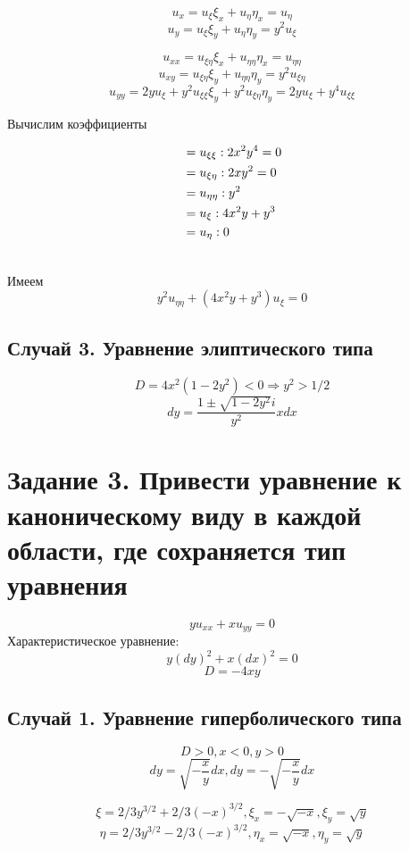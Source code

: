 \documentclass[12pt]{article}
\begin{document}
$$u_x = u_\xi\xi_x + u_\eta\eta_x = u_\eta$$
$$u_y = u_\xi\xi_y + u_\eta\eta_y = y^2u_\xi$$

$$u_{xx} = u_{\xi\eta}\xi_x + u_{\eta\eta}\eta_x = u_{\eta\eta}$$
$$u_{xy} = u_{\xi\eta}\xi_y + u_{\eta\eta}\eta_y = y^2u_{\xi\eta}$$
$$u_{yy} = 2yu_\xi + y^2u_{\xi\xi}\xi_y + y^2u_{\xi\eta}\eta_y = 2yu_\xi + y^4u_{\xi\xi}$$

Вычислим коэффициенты

\begin{align}
&=u_{\xi\xi} : 2x^2y^4 = 0 \\ \notag
&=u_{\xi\eta}: 2xy^2 = 0 \\ \notag
&=u_{\eta\eta}: y^2 \\ \notag
&=u_\xi: 4x^2y + y^3 \\ \notag
&=u_\eta: 0 \\ \notag
\end{align}

Имеем
$$y^2u_{\eta\eta} + (4x^2y + y^3)u_\xi = 0$$


\subsection{Случай 3. Уравнение элиптического типа}
$$D = 4x^2(1-2y^2) < 0 \Rightarrow y^2 > 1/2$$
$$dy = \frac{1 \pm \sqrt{1-2y^2}i}{y^2}xdx$$

\section{Задание 3. Привести уравнение к каноническому виду в каждой области, где сохраняется тип уравнения}
$$yu_{xx} + xu_{yy} = 0$$
Характеристическое уравнение:
$$y(dy)^2 + x(dx)^2 = 0$$
$$D = -4xy$$

\subsection{Случай 1. Уравнение гиперболического типа}
$$D > 0, x < 0, y > 0$$
$$dy = \sqrt{-\frac{x}{y}}dx,
dy = -\sqrt{-\frac{x}{y}}dx$$

$$\xi = 2/3y^{3/2} + 2/3(-x)^{3/2}, \xi_x = -\sqrt{-x}, \xi_y = \sqrt{y}$$
$$\eta = 2/3y^{3/2} - 2/3(-x)^{3/2}, \eta_x = \sqrt{-x}, \eta_y = \sqrt{y}$$
\end{document}
